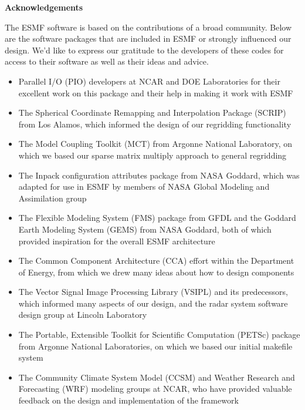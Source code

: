 
\vspace{2in}
\begin{center}
{\bf Acknowledgements}
\end{center}

The ESMF software is based on the contributions of a broad community.
Below are the software packages that are included in ESMF or strongly 
influenced our design.  We'd like to express our gratitude to the 
developers of these codes for access to their software as well as their 
ideas and advice.

\begin{itemize}

\item Parallel I/O (PIO) developers at NCAR and DOE Laboratories for their 
excellent work on this package and their help in making it work with ESMF

\item The Spherical Coordinate Remapping and Interpolation Package (SCRIP) 
from Los Alamos, which informed the design of our regridding functionality

\item The Model Coupling Toolkit (MCT) from Argonne National Laboratory,
on which we based our sparse matrix multiply approach to general 
regridding

\item The Inpack configuration attributes package from NASA Goddard, 
which was adapted for use in ESMF by members of NASA Global Modeling and 
Assimilation group

\item The Flexible Modeling System (FMS) package from GFDL and the 
Goddard Earth Modeling System (GEMS) from NASA Goddard, both of which 
provided inspiration for the overall ESMF architecture 

\item The Common Component Architecture (CCA) effort within the Department
of Energy, from which we drew many ideas about how to design components

\item The Vector Signal Image Processing Library (VSIPL) and its
predecessors, which informed many aspects of our design, and the 
radar system software design group at Lincoln Laboratory

\item The Portable, Extensible Toolkit for Scientific Computation (PETSc) 
package from Argonne National Laboratories, on which we 
based our initial makefile system

\item The Community Climate System Model (CCSM) and Weather Research and
Forecasting (WRF) modeling groups at NCAR, who have provided valuable
feedback on the design and implementation of the framework

\end{itemize}